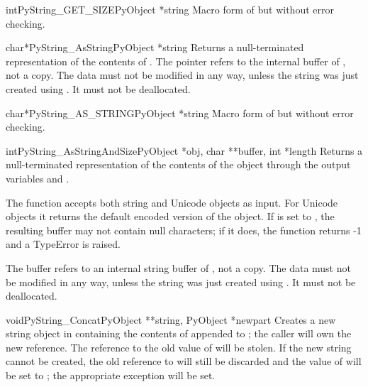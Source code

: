 \documentclass{manual}
\begin{document}
\begin{cfuncdesc}{int}{PyString_GET_SIZE}{PyObject *string}
Macro form of  but without error
checking.
\end{cfuncdesc}

\begin{cfuncdesc}{char*}{PyString_AsString}{PyObject *string}
Returns a null-terminated representation of the contents of
.  The pointer refers to the internal buffer of
, not a copy.  The data must not be modified in any way,
unless the string was just created using
.
It must not be deallocated.
\end{cfuncdesc}

\begin{cfuncdesc}{char*}{PyString_AS_STRING}{PyObject *string}
Macro form of  but without error
checking.
\end{cfuncdesc}

\begin{cfuncdesc}{int}{PyString_AsStringAndSize}{PyObject *obj,
                                                 char **buffer,
                                                 int *length}
Returns a null-terminated representation of the contents of the object
 through the output variables  and .

The function accepts both string and Unicode objects as input. For
Unicode objects it returns the default encoded version of the object.
If  is set to \NULL{}, the resulting buffer may not contain
null characters; if it does, the function returns -1 and a
TypeError is raised.

The buffer refers to an internal string buffer of , not a
copy. The data must not be modified in any way, unless the string was
just created using .  It must not be deallocated.
\end{cfuncdesc}

\begin{cfuncdesc}{void}{PyString_Concat}{PyObject **string,
                                         PyObject *newpart}
Creates a new string object in  containing the
contents of  appended to ; the caller will
own the new reference.  The reference to the old value of 
will be stolen.  If the new string
cannot be created, the old reference to  will still be
discarded and the value of  will be set to
\NULL{}; the appropriate exception will be set.
\end{cfuncdesc}
\end{document}
